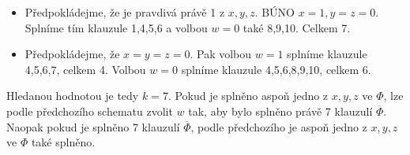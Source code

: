 \documentclass[a4wide,8pt]{extarticle}
\begin{document}
\begin{enumerate}
\begin{itemize}
			\item Předpokládejme, že je pravdivá právě 1 z $x,y,z$. BÚNO $x=1, y=z=0$. Splníme tím klauzule 1,4,5,6 a volbou $w=0$ také 8,9,10. Celkem 7.
			\item Předpokládejme, že $x=y=z=0$. Pak volbou $w=1$ splníme klauzule 4,5,6,7, celkem 4. Volbou $w=0$ splníme klauzule 4,5,6,8,9,10, celkem 6.
		\end{itemize}
		Hledanou hodnotou je tedy $k=7$. Pokud je splněno aspoň jedno z $x,y,z$ ve $\Phi$, lze podle předchozího schematu zvolit $w$ tak, aby bylo splněno právě 7 klauzulí $\overline{\Phi}$. Naopak pokud je splněno 7 klauzulí $\overline{\Phi}$, podle předchozího je aspoň jedno z $x,y,z$ ve $\Phi$ také splněno.
\end{enumerate}
\end{document}
